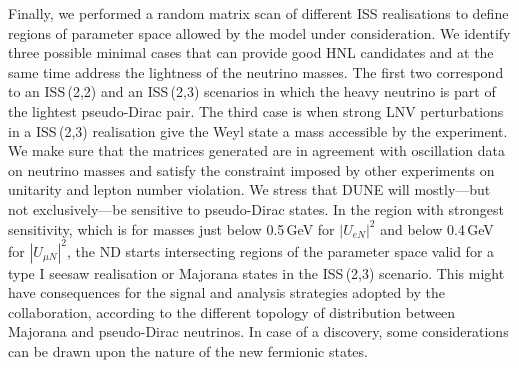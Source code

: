 Finally, we performed a random matrix scan of different ISS realisations to define regions of parameter space %
allowed by the model under consideration.
We identify three possible minimal cases that can provide good HNL candidates and at the same time address the lightness of the neutrino masses.
The first two correspond to an ISS\,(2,2) and an ISS\,(2,3) scenarios in which the heavy neutrino is part of the lightest pseudo-Dirac pair.
The third case is when strong LNV perturbations in a ISS\,(2,3) realisation give the Weyl state a mass accessible by the experiment.
We make sure that the matrices generated are in agreement with oscillation data on neutrino masses and satisfy the constraint %
imposed by other experiments on unitarity and lepton number violation.
We stress that DUNE will mostly---but not exclusively---be sensitive to pseudo-Dirac states.
In the region with strongest sensitivity, which is for masses just below 0.5\,GeV for $|U_{e N}|^2$ and %
below 0.4\,GeV for $|U_{\mu N}|^2$, the ND starts intersecting regions of the parameter space %
valid for a type I seesaw realisation or Majorana states in the ISS\,(2,3) scenario.
This might have consequences for the signal and analysis strategies adopted by the collaboration, %
according to the different topology of distribution between Majorana and pseudo-Dirac neutrinos.
\enlargethispage{\baselineskip}
In case of a discovery, some considerations can be drawn upon the nature of the new fermionic states.
